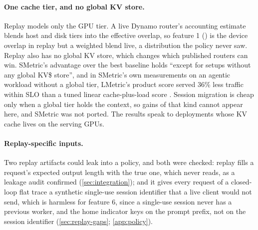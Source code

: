 \paragraph{One cache tier, and no global KV store.}
Replay models only the GPU tier. A live Dynamo router's accounting estimate blends host and disk
tiers into the effective overlap, so feature 1 () is the device overlap in
replay but a weighted blend live, a distribution the policy never saw. Replay also has no global KV
store, which changes which published routers can win. SMetric's advantage over the best baseline
holds ``except for setups without any global KV\$ store'', and in SMetric's own measurements on an
agentic workload without a global tier, LMetric's product score served 36\% less traffic within
SLO than a tuned linear cache-plus-load score \citep{wang2026smetric,zhang2026lmetric}. Session
migration is cheap only when a global tier holds the context, so gains of that kind cannot
appear here, and SMetric was not ported. The results speak to deployments whose KV cache lives on
the serving GPUs.

\paragraph{Replay-specific inputs.}
Two replay artifacts could leak into a policy, and both were checked: replay fills a request's
expected output length with the true one, which \lc{} never reads, as a leakage audit confirmed
(\cref{sec:integration}); and it gives every request of a closed-loop flat trace a synthetic
single-use session identifier that a live client would not send, which is harmless for feature 6,
since a single-use session never has a previous worker, and the  home indicator keys on the
prompt prefix, not on the session identifier (\cref{sec:replay-gaps}; \cref{app:policy}).

